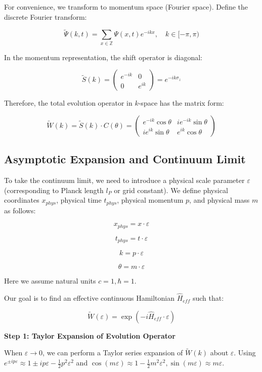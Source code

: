For convenience, we transform to momentum space (Fourier space). Define the discrete Fourier transform:

\[\tilde{\Psi}(k, t) = \sum_{x \in \mathbb{Z}} \Psi(x, t) e^{-ikx}, \quad k \in [-\pi, \pi)\]

In the momentum representation, the shift operator is diagonal:

\[\tilde{S}(k) = \begin{pmatrix} e^{-ik} & 0 \\ 0 & e^{ik} \end{pmatrix} = e^{-ik \sigma_z}\]

Therefore, the total evolution operator in $k$-space has the matrix form:

\[\tilde{W}(k) = \tilde{S}(k) \cdot C(\theta) = \begin{pmatrix} e^{-ik} \cos \theta & i e^{-ik} \sin \theta \\ i e^{ik} \sin \theta & e^{ik} \cos \theta \end{pmatrix}\]

\subsection{Asymptotic Expansion and Continuum Limit}

To take the continuum limit, we need to introduce a physical scale parameter $\varepsilon$ (corresponding to Planck length $l_P$ or grid constant).
We define physical coordinates $x_{phys}$, physical time $t_{phys}$, physical momentum $p$, and physical mass $m$ as follows:

\[x_{phys} = x \cdot \varepsilon\]

\[t_{phys} = t \cdot \varepsilon\]

\[k = p \cdot \varepsilon\]

\[\theta = m \cdot \varepsilon\]

Here we assume natural units $c=1, \hbar=1$.

Our goal is to find an effective continuous Hamiltonian $\hat{H}_{eff}$ such that:

\[\tilde{W}(\varepsilon) = \exp(-i \hat{H}_{eff} \cdot \varepsilon)\]

\textbf{Step 1: Taylor Expansion of Evolution Operator}

When $\varepsilon \to 0$, we can perform a Taylor series expansion of $\tilde{W}(k)$ about $\varepsilon$.
Using $e^{\pm i p \varepsilon} \approx 1 \pm i p \varepsilon - \frac{1}{2} p^2 \varepsilon^2$ and $\cos(m\varepsilon) \approx 1 - \frac{1}{2}m^2\varepsilon^2, \sin(m\varepsilon) \approx m\varepsilon$.


